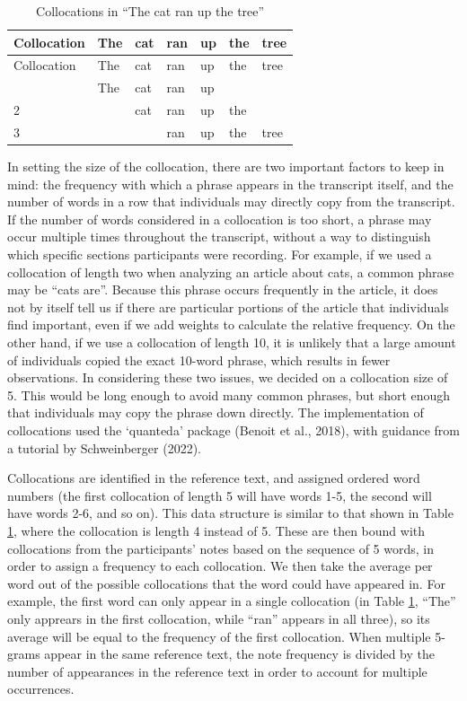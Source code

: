 \documentclass[print]{nuthesis}
\begin{document}
\begin{longtable}[]{@{}lllllll@{}}
\caption{Collocations in ``The cat ran up the tree'' \label{tab:colex}}\tabularnewline
\toprule\noalign{}
Collocation & The & cat & ran & up & the & tree \\
\midrule\noalign{}
\endfirsthead
\toprule\noalign{}
Collocation & The & cat & ran & up & the & tree \\
\midrule\noalign{}
\endhead
\bottomrule\noalign{}
\endlastfoot
1 & The & cat & ran & up & & \\
2 & & cat & ran & up & the & \\
3 & & & ran & up & the & tree \\
\end{longtable}

In setting the size of the collocation, there are two important factors to keep in mind: the frequency with which a phrase appears in the transcript itself, and the number of words in a row that individuals may directly copy from the transcript.
If the number of words considered in a collocation is too short, a phrase may occur multiple times throughout the transcript, without a way to distinguish which specific sections participants were recording.
For example, if we used a collocation of length two when analyzing an article about cats, a common phrase may be ``cats are''.
Because this phrase occurs frequently in the article, it does not by itself tell us if there are particular portions of the article that individuals find important, even if we add weights to calculate the relative frequency.
On the other hand, if we use a collocation of length 10, it is unlikely that a large amount of individuals copied the exact 10-word phrase, which results in fewer observations.
In considering these two issues, we decided on a collocation size of 5.
This would be long enough to avoid many common phrases, but short enough that individuals may copy the phrase down directly.
The implementation of collocations used the `quanteda' package (Benoit et al., 2018), with guidance from a tutorial by Schweinberger (2022).

Collocations are identified in the reference text, and assigned ordered word numbers (the first collocation of length 5 will have words 1-5, the second will have words 2-6, and so on).
This data structure is similar to that shown in Table \ref{tab:colex}, where the collocation is length 4 instead of 5.
These are then bound with collocations from the participants' notes based on the sequence of 5 words, in order to assign a frequency to each collocation.
We then take the average per word out of the possible collocations that the word could have appeared in.
For example, the first word can only appear in a single collocation (in Table \ref{tab:colex}, ``The'' only apprears in the first collocation, while ``ran'' appears in all three), so its average will be equal to the frequency of the first collocation.
When multiple 5-grams appear in the same reference text, the note frequency is divided by the number of appearances in the reference text in order to account for multiple occurrences.
\end{document}
